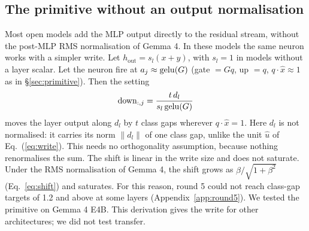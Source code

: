 \subsection{The primitive without an output normalisation}
\label{app:nonorm}
Most open models add the MLP output directly to the residual stream, without the post-MLP RMS normalisation of Gemma 4. In these models the same neuron works with a simpler write. Let $h_{\mathrm{out}} = s_l (x + y)$, with $s_l = 1$ in models without a layer scalar. Let the neuron fire at $a_j \approx \mathrm{gelu}(G)$ (gate $= G q$, up $= q$, $q \cdot \hat{x} \approx 1$ as in \S\ref{sec:primitive}). Then the setting
\begin{equation}
\mathrm{down}_{:,j} = \frac{t\, d_l}{s_l\, \mathrm{gelu}(G)}
\end{equation}
moves the layer output along $d_l$ by $t$ class gaps wherever $q \cdot \hat{x} = 1$. Here $d_l$ is not normalised: it carries its norm $\lVert d_l \rVert$ of one class gap, unlike the unit $\hat{u}$ of Eq.~(\ref{eq:write}). This needs no orthogonality assumption, because nothing renormalises the sum. The shift is linear in the write size and does not saturate. Under the RMS normalisation of Gemma 4, the shift grows as $\beta/\sqrt{1+\beta^2}$ (Eq.~\ref{eq:shift}) and saturates. For this reason, round 5 could not reach class-gap targets of 1.2 and above at some layers (Appendix~\ref{app:round5}). We tested the primitive on Gemma 4 E4B. This derivation gives the write for other architectures; we did not test transfer.

